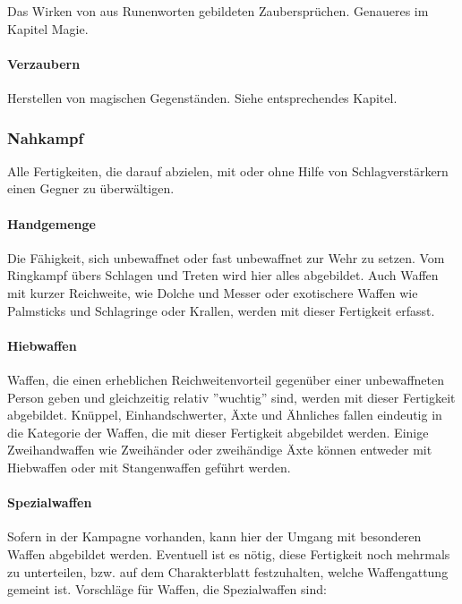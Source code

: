 \documentclass{article}
\begin{document}
Das Wirken von aus Runenworten gebildeten Zaubersprüchen. Genaueres im Kapitel Magie.

\paragraph{Verzaubern}

Herstellen von magischen Gegenständen. Siehe entsprechendes Kapitel.

\subsubsection{Nahkampf}

Alle Fertigkeiten, die darauf abzielen, mit oder ohne Hilfe von Schlagverstärkern einen Gegner zu überwältigen.

\paragraph{Handgemenge}

Die Fähigkeit, sich unbewaffnet oder fast unbewaffnet zur Wehr zu setzen. Vom Ringkampf übers Schlagen und Treten
wird hier alles abgebildet. Auch Waffen mit kurzer Reichweite, wie Dolche und Messer oder exotischere Waffen wie
Palmsticks und Schlagringe oder Krallen, werden mit dieser Fertigkeit erfasst.

\paragraph{Hiebwaffen}

Waffen, die einen erheblichen Reichweitenvorteil gegenüber einer unbewaffneten Person geben und gleichzeitig relativ
''wuchtig'' sind, werden mit dieser Fertigkeit abgebildet. Knüppel, Einhandschwerter, Äxte und Ähnliches fallen
eindeutig in die Kategorie der Waffen, die mit dieser Fertigkeit abgebildet werden. Einige Zweihandwaffen wie
Zweihänder oder zweihändige Äxte können entweder mit Hiebwaffen oder mit Stangenwaffen geführt werden.

\paragraph{Spezialwaffen}

Sofern in der Kampagne vorhanden, kann hier der Umgang mit besonderen Waffen abgebildet werden. Eventuell ist es nötig,
diese Fertigkeit noch mehrmals zu unterteilen, bzw. auf dem Charakterblatt festzuhalten, welche Waffengattung gemeint
ist. Vorschläge für Waffen, die Spezialwaffen sind:
\end{document}
